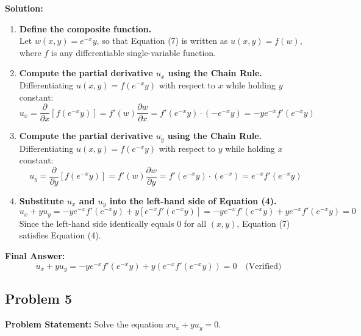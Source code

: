 \documentclass[11pt]{article}
\begin{document}
\textbf{Solution:}
\begin{enumerate}[label=\textbf{Step \arabic*:}]
    \item \textbf{Define the composite function.} \\
    Let $w(x, y) = e^{-x}y$, so that Equation (7) is written as $u(x, y) = f(w)$, where $f$ is any differentiable single-variable function.

    \item \textbf{Compute the partial derivative $u_x$ using the Chain Rule.} \\
    Differentiating $u(x, y) = f(e^{-x}y)$ with respect to $x$ while holding $y$ constant:
    \[
    u_x = \frac{\partial}{\partial x}\left[f(e^{-x}y)\right] = f'(w)\frac{\partial w}{\partial x} = f'(e^{-x}y)\cdot \left(-e^{-x}y\right) = -ye^{-x}f'(e^{-x}y)
    \]

    \item \textbf{Compute the partial derivative $u_y$ using the Chain Rule.} \\
    Differentiating $u(x, y) = f(e^{-x}y)$ with respect to $y$ while holding $x$ constant:
    \[
    u_y = \frac{\partial}{\partial y}\left[f(e^{-x}y)\right] = f'(w)\frac{\partial w}{\partial y} = f'(e^{-x}y)\cdot \left(e^{-x}\right) = e^{-x}f'(e^{-x}y)
    \]

    \item \textbf{Substitute $u_x$ and $u_y$ into the left-hand side of Equation (4).} \\
    \[
    u_x + yu_y = -ye^{-x}f'(e^{-x}y) + y\left[e^{-x}f'(e^{-x}y)\right] = -ye^{-x}f'(e^{-x}y) + ye^{-x}f'(e^{-x}y) = 0
    \]
    Since the left-hand side identically equals $0$ for all $(x, y)$, Equation (7) satisfies Equation (4).
\end{enumerate}

\noindent\textbf{Final Answer:}
\[
\boxed{u_x + yu_y = -ye^{-x}f'(e^{-x}y) + y\left(e^{-x}f'(e^{-x}y)\right) = 0 \quad \text{(Verified)}}
\]

\hrulefill

\subsection*{Problem 5}
\textbf{Problem Statement:} Solve the equation $xu_x + yu_y = 0$.
\end{document}
